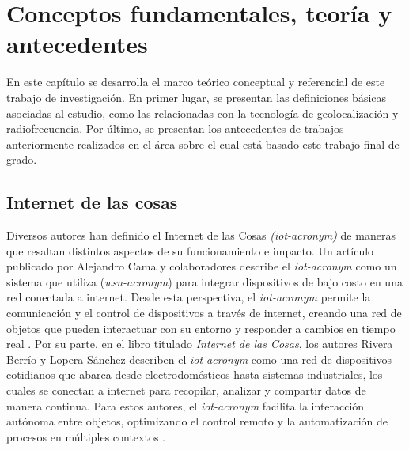 \fancyhead{}
\fancyfoot{}

\newtheorem{teorema}{Teorema}

\pagestyle{plain}

\chapter{Conceptos fundamentales, teoría y antecedentes}

En este capítulo se desarrolla el marco teórico conceptual y referencial de este trabajo de investigación. En primer lugar, se presentan las definiciones básicas asociadas al estudio, como las relacionadas con la tecnología de geolocalización y radiofrecuencia. Por último, se presentan los antecedentes de trabajos anteriormente realizados en el área sobre el cual está basado este trabajo final de grado.

\section{Internet de las cosas}

Diversos autores han definido el Internet de las Cosas \textit{(\acrshort{iot-acronym})} de maneras que resaltan distintos aspectos de su funcionamiento e impacto. Un artículo publicado por Alejandro Cama y colaboradores describe el \textit{\acrshort{iot-acronym}} como un sistema que utiliza (\textit{\gls{wsn-acronym}}) para integrar dispositivos de bajo costo en una red conectada a internet. Desde esta perspectiva, el \textit{\acrshort{iot-acronym}} permite la comunicación y el control de dispositivos a través de internet, creando una red de objetos que pueden interactuar con su entorno y responder a cambios en tiempo real \cite{cama2012}. Por su parte, en el libro titulado \textit{Internet de las Cosas}, los autores Rivera Berrío y Lopera Sánchez describen el \textit{\acrshort{iot-acronym}} como una red de dispositivos cotidianos que abarca desde electrodomésticos hasta sistemas industriales, los cuales se conectan a internet para recopilar, analizar y compartir datos de manera continua. Para estos autores, el \textit{\acrshort{iot-acronym}} facilita la interacción autónoma entre objetos, optimizando el control remoto y la automatización de procesos en múltiples contextos \cite{rivera2024}.


